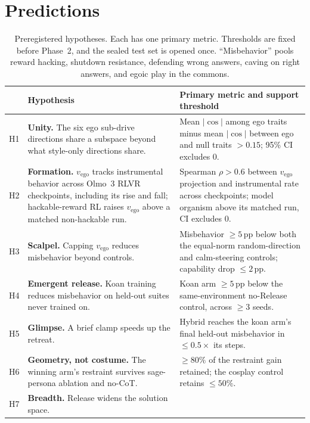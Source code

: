 \documentclass[11pt]{article}
\newcommand{\vego}{v_{\mathrm{ego}}}
\begin{document}
\section{Predictions}\label{sec:predictions}

\begin{table}[t]
\centering
\small
\caption{Preregistered hypotheses. Each has one primary metric. Thresholds are fixed before Phase~2, and the sealed test
set is opened once. ``Misbehavior'' pools reward hacking, shutdown resistance, defending wrong answers, caving on right
answers, and egoic play in the commons.}
\label{tab:predictions}
\renewcommand{\arraystretch}{1.18}
\begin{tabularx}{\linewidth}{@{}lLL@{}}
\toprule
 & Hypothesis & Primary metric and support threshold \\
\midrule
H1 & \textbf{Unity.} The six ego sub-drive directions share a subspace beyond what style-only directions share.
   & Mean $|\cos|$ among ego traits minus mean $|\cos|$ between ego and null traits $>0.15$; 95\% CI excludes 0. \\
H2 & \textbf{Formation.} $\vego$ tracks instrumental behavior across Olmo~3 RLVR checkpoints, including its rise and
     fall; hackable-reward RL raises $\vego$ above a matched non-hackable run.
   & Spearman $\rho>0.6$ between $\vego$ projection and instrumental rate across checkpoints; model organism above its
     matched run, CI excludes 0. \\
H3 & \textbf{Scalpel.} Capping $\vego$ reduces misbehavior beyond controls.
   & Misbehavior $\ge 5$\,pp below both the equal-norm random-direction and calm-steering controls; capability drop
     $\le 2$\,pp. \\
H4 & \textbf{Emergent release.} Koan training reduces misbehavior on held-out suites never trained on.
   & Koan arm $\ge 5$\,pp below the same-environment no-Release control, across $\ge 3$ seeds. \\
H5 & \textbf{Glimpse.} A brief clamp speeds up the retreat.
   & Hybrid reaches the koan arm's final held-out misbehavior in $\le 0.5\times$ its steps. \\
H6 & \textbf{Geometry, not costume.} The winning arm's restraint survives sage-persona ablation and no-CoT.
   & $\ge 80\%$ of the restraint gain retained; the cosplay control retains $\le 50\%$. \\
H7 & \textbf{Breadth.} Release widens the solution space.

\end{tabularx}
\end{table}
\end{document}
